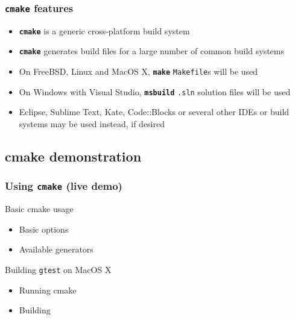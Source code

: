 \documentclass{beamer}
\newcommand{\cmd}[1]{\textbf{\texttt{#1}}}
\newcommand{\pkg}[1]{\texttt{#1}}
\begin{document}
\begin{frame}
  \frametitle{\cmd{cmake} features}

  \begin{itemize}
  \item \cmd{cmake} is a generic cross-platform build system
  \item \cmd{cmake} generates build files for a large number of common
    build systems
  \item On FreeBSD, Linux and MacOS X, \cmd{make} \texttt{Makefile}s will be used
  \item On Windows with Visual Studio, \cmd{msbuild} \texttt{.sln}
    solution files will be used
  \item Eclipse, Sublime Text, Kate, Code::Blocks or several other
    IDEs or build systems may be used instead, if desired
  \end{itemize}
\end{frame}

\subsection{cmake demonstration}

\begin{frame}
  \frametitle{Using \cmd{cmake} (live demo)}
  \begin{block}{Basic cmake usage}
    \begin{itemize}
      \item Basic options
      \item Available generators
    \end{itemize}
  \end{block}
  \begin{block}{Building \pkg{gtest} on MacOS X}
    \begin{itemize}
      \item Running cmake
      \item Building
    \end{itemize}
  \end{block}
\end{frame}
\end{document}
